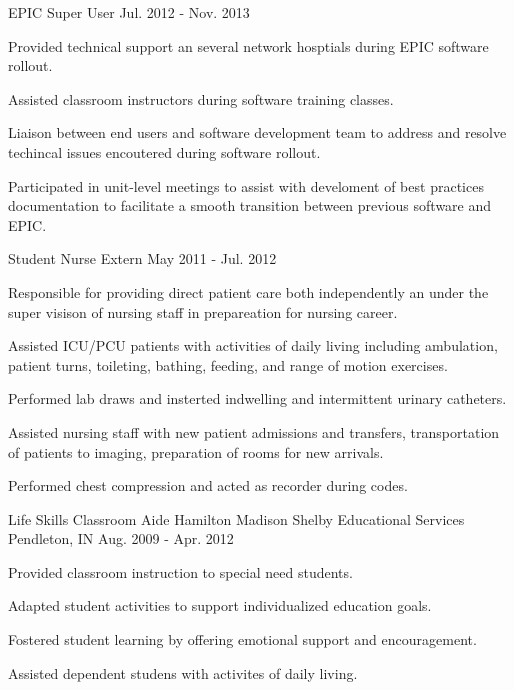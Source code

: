 \begin{cventries}
  \cventry
    {EPIC Super User}
    {}
    {}
    {Jul. 2012 - Nov. 2013}
    {
      \begin{cvitems}
      \item {Provided technical support an several network hosptials during EPIC software rollout.}
      \item {Assisted classroom instructors during software training classes.}
      \item {Liaison between end users and software development team to address and resolve techincal issues encoutered during software rollout.}
      \item {Participated in unit-level meetings to assist with develoment of best practices documentation to facilitate a smooth transition between previous software and EPIC.}
      \end{cvitems}
    }

  \cventry
    {Student Nurse Extern}
    {}
    {}
    {May 2011 - Jul. 2012}
    {
      \begin{cvitems}
      \item {Responsible for providing direct patient care both independently an under the super visison of nursing staff in prepareation for nursing career.}
      \item {Assisted ICU/PCU patients with activities of daily living including ambulation, patient turns, toileting, bathing, feeding, and range of motion exercises.}
      \item {Performed lab draws and insterted indwelling and intermittent urinary catheters.}
      \item {Assisted nursing staff with new patient admissions and transfers, transportation of patients to imaging, preparation of rooms for new arrivals.}
      \item {Performed chest compression and acted as recorder during codes.}
      \end{cvitems}
    }

  \cventry
    {Life Skills Classroom Aide} %
    {Hamilton Madison Shelby Educational Services} %
    {Pendleton, IN} %
    {Aug. 2009 - Apr. 2012} %
    {
      \begin{cvitems} %
        \item {Provided classroom instruction to special need students.}
        \item {Adapted student activities to support individualized education goals.}
        \item {Fostered student learning by offering emotional support and encouragement.}
        \item {Assisted dependent studens with activites of daily living.}
      \end{cvitems}
    }

\end{cventries}
